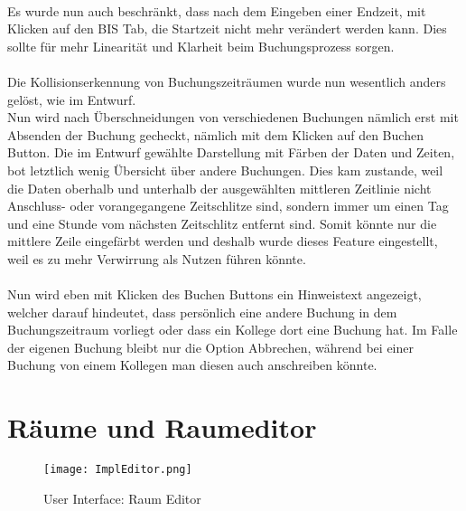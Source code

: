 \paragraph{}
Es wurde nun auch beschränkt, dass nach dem Eingeben einer Endzeit, mit Klicken auf den BIS Tab, die Startzeit nicht mehr verändert werden kann.
Dies sollte für mehr Linearität und Klarheit beim Buchungsprozess sorgen.

\paragraph{}
Die Kollisionserkennung von Buchungszeiträumen wurde nun wesentlich anders gelöst, wie im Entwurf.
\\
Nun wird nach Überschneidungen von verschiedenen Buchungen nämlich erst mit Absenden der Buchung gecheckt, nämlich mit dem Klicken auf den Buchen Button.
Die im Entwurf gewählte Darstellung mit Färben der Daten und Zeiten, bot letztlich wenig Übersicht über andere Buchungen.
Dies kam zustande, weil die Daten oberhalb und unterhalb der ausgewählten mittleren Zeitlinie nicht Anschluss- oder vorangegangene Zeitschlitze sind,
sondern immer um einen Tag und eine Stunde vom nächsten Zeitschlitz entfernt sind. 
Somit könnte nur die mittlere Zeile eingefärbt werden und deshalb wurde dieses Feature eingestellt, weil es zu mehr Verwirrung als Nutzen führen könnte.
\paragraph{}
Nun wird eben mit Klicken des Buchen Buttons ein Hinweistext angezeigt, welcher darauf hindeutet, dass persönlich eine andere Buchung in dem Buchungszeitraum vorliegt oder dass ein Kollege dort eine Buchung hat.
Im Falle der eigenen Buchung bleibt nur die Option Abbrechen, während bei einer Buchung von einem Kollegen man diesen auch anschreiben könnte.

\newpage
\section{Räume und Raumeditor}

\begin{figure}[!h]
  \centering
  \texttt{[image: ImplEditor.png]}
  \caption{User Interface: Raum Editor}
  \label{fig:UI_Editor}
\end{figure}

